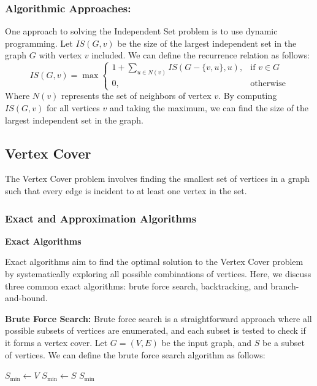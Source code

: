 \subsubsection{Algorithmic Approaches:} 
One approach to solving the Independent Set problem is to use dynamic programming. Let \(IS(G, v)\) be the size of the largest independent set in the graph \(G\) with vertex \(v\) included. We can define the recurrence relation as follows:
\[
IS(G, v) = \max\left\{
\begin{array}{ll}
1 + \sum_{u \in N(v)} IS(G - \{v, u\}, u), & \text{if } v \in G \\
0, & \text{otherwise}
\end{array}
\right.
\]
Where \(N(v)\) represents the set of neighbors of vertex \(v\). By computing \(IS(G, v)\) for all vertices \(v\) and taking the maximum, we can find the size of the largest independent set in the graph.




\subsection{Vertex Cover}

The Vertex Cover problem involves finding the smallest set of vertices in a graph such that every edge is incident to at least one vertex in the set.

\subsubsection{Exact and Approximation Algorithms} 
\textbf{Exact Algorithms}

Exact algorithms aim to find the optimal solution to the Vertex Cover problem by systematically exploring all possible combinations of vertices. Here, we discuss three common exact algorithms: brute force search, backtracking, and branch-and-bound.

\textbf{Brute Force Search:} Brute force search is a straightforward approach where all possible subsets of vertices are enumerated, and each subset is tested to check if it forms a vertex cover. Let \(G = (V, E)\) be the input graph, and \(S\) be a subset of vertices. We can define the brute force search algorithm as follows:
\FloatBarrier
\begin{algorithm}
\caption{Brute Force Vertex Cover}
\begin{algorithmic}[1]
\State $S_{\text{min}} \gets V$
        \State $S_{\text{min}} \gets S$
    \EndIf
\EndFor
\State \Return $S_{\text{min}}$
\EndFunction
\end{algorithmic}
\end{algorithm}
\FloatBarrier

